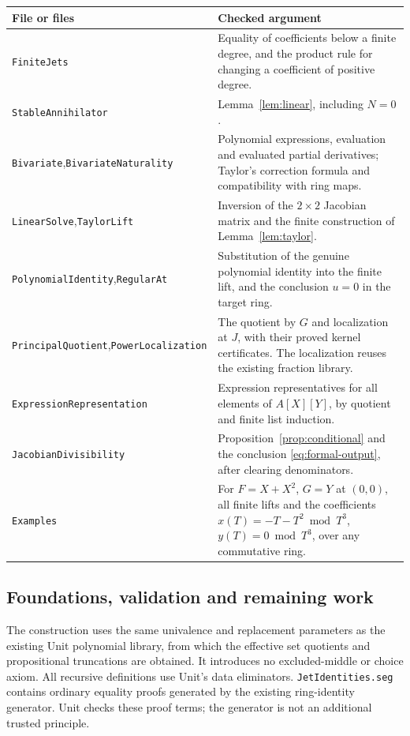 \documentclass[11pt]{amsart}
\theoremstyle{definition}
\theoremstyle{remark}
\newcommand{\code}[1]{\texttt{#1}}
\begin{document}
\begin{longtable}{@{}p{}p{}@{}}
\textbf{File or files}&\textbf{Checked argument}\\[4pt]
\endhead
\code{FiniteJets}&
Equality of coefficients below a finite degree, and the product rule
for changing a coefficient of positive degree.\\[5pt]
\code{StableAnnihilator}&
Lemma~\ref{lem:linear}, including $N=0$.\\[5pt]
\code{Bivariate},\newline\code{BivariateNaturality}&
Polynomial expressions, evaluation and evaluated partial derivatives;
Taylor's correction formula and compatibility with ring maps.\\[5pt]
\code{LinearSolve},\newline\code{TaylorLift}&
Inversion of the $2\times2$ Jacobian matrix and the finite construction
of Lemma~\ref{lem:taylor}.\\[5pt]
\code{PolynomialIdentity},\newline\code{RegularAt}&
Substitution of the genuine polynomial identity into the finite lift,
and the conclusion $u=0$ in the target ring.\\[5pt]
\code{PrincipalQuotient},\newline\code{PowerLocalization}&
The quotient by $G$ and localization at $J$, with their proved kernel
certificates. The localization reuses the existing fraction library.\\[5pt]
\code{ExpressionRepresentation}&
Expression representatives for all elements of $A[X][Y]$, by
quotient and finite list induction.\\[5pt]
\code{JacobianDivisibility}&
Proposition~\ref{prop:conditional} and the conclusion
\eqref{eq:formal-output}, after clearing denominators.\\[5pt]
\code{Examples}&
For $F=X+X^2$, $G=Y$ at $(0,0)$, all finite lifts and the coefficients
$x(T)=-T-T^2\bmod T^3$, $y(T)=0\bmod T^3$, over any commutative ring.
\end{longtable}

\subsection*{Foundations, validation and remaining work}

The construction uses the same univalence and replacement parameters
as the existing Unit polynomial library, from which the effective set
quotients and propositional truncations are obtained. It introduces
no excluded-middle or choice axiom. All recursive definitions use
Unit's data eliminators.
\code{JetIdentities.seg} contains ordinary equality proofs generated
by the existing ring-identity generator. Unit checks these proof terms;
the generator is not an additional trusted principle.
\end{document}
